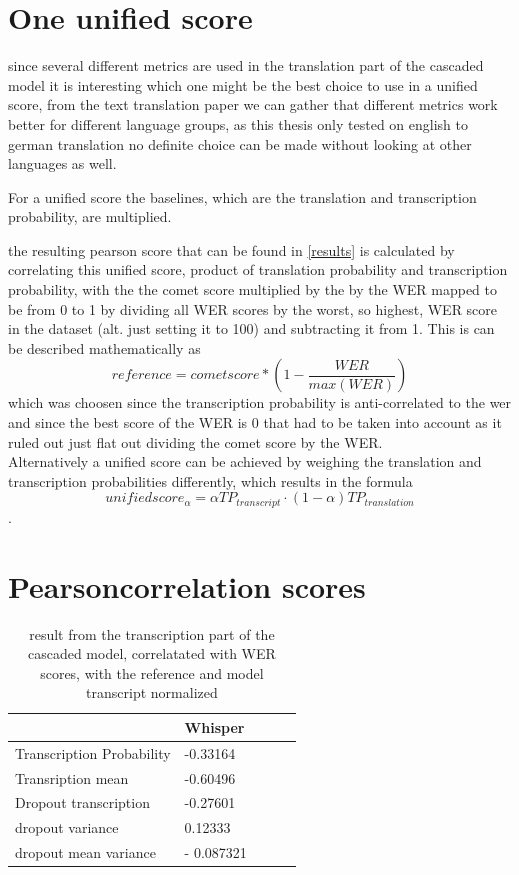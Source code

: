 \section{One unified score}
since several different metrics are used in the translation part of the cascaded model it is interesting which one might be the best choice to use in a unified score, from the text translation paper \cite{fomicheva2020unsupervised} we can gather that different metrics work better for different language groups, as this thesis only tested on english to german translation no definite choice can be made without looking at other languages as well.

For a unified score the baselines, which are the translation and transcription probability, are multiplied. 

the resulting pearson score that can be found in \ref{results} is calculated by correlating this unified score, product of translation probability and transcription probability, with the the comet score multiplied by the by the WER mapped to be from 0 to 1 by dividing all WER scores by the worst, so highest, WER score in the dataset (alt. just setting it to 100) and subtracting it from 1. 
This is can be described mathematically as 
$$reference = cometscore*(1-\frac{WER}{max(WER)})$$
which was choosen since the transcription probability is anti-correlated to the wer and since the best score of the WER is 0 that had to be taken into account as it ruled out just flat out dividing the comet score by the WER.\\

Alternatively a unified score can be achieved by weighing the translation and transcription probabilities differently, which results in the formula $$unifiedscore_\alpha= \alpha TP_{transcript} \cdot (1-\alpha)TP_{translation}$$. 

\section{Pearsoncorrelation scores}
\begin{table}[ht]
  \begin{tabular}
  {l|llll}
  &  Whisper \\ \hline
  Transcription Probability& -0.33164 \\
  Transription mean & -0.60496 \\ \hline
  Dropout transcription & -0.27601 \\
  dropout variance &  0.12333\\
  dropout mean variance & - 0.087321\\
  \end{tabular}

  \caption{result from the transcription part of the cascaded model, correlatated with WER scores, with the reference and model transcript normalized}
    \label{transcription results}
\end{table}

